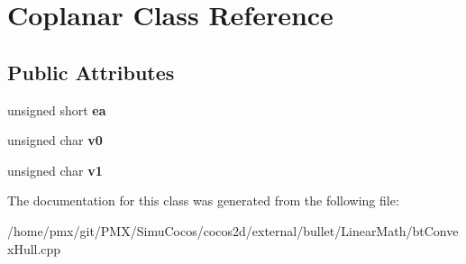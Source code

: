 \hypertarget{classCoplanar}{}\section{Coplanar Class Reference}
\label{classCoplanar}
\subsection*{Public Attributes}
\begin{DoxyCompactItemize}
\item 
\mbox{\label{classCoplanar_a50a8f1e8391f6a471752dc8e1c67ed49}} 
unsigned short {\bfseries ea}
\item 
\mbox{\label{classCoplanar_a561deee71b84a9b8821085a3f7b8e426}} 
unsigned char {\bfseries v0}
\item 
\mbox{\label{classCoplanar_ae1d2ce847db893859e6e4dba0825b2e7}} 
unsigned char {\bfseries v1}
\end{DoxyCompactItemize}


The documentation for this class was generated from the following file\+:\begin{DoxyCompactItemize}
\item 
/home/pmx/git/\+P\+M\+X/\+Simu\+Cocos/cocos2d/external/bullet/\+Linear\+Math/bt\+Convex\+Hull.\+cpp\end{DoxyCompactItemize}
